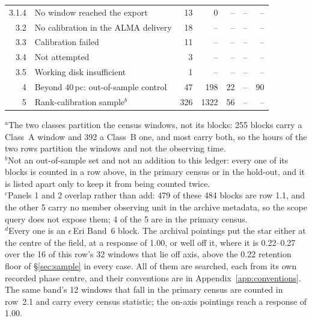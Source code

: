 \begin{tabular}{@{}r@{~}p{}rrrrr@{}}
3.1.4 & \hspace{1.6em}No window reached the export & 13 & 0 & -- & -- & -- \\
3.2 & \hspace{0.8em}No calibration in the ALMA delivery & 18 & -- & -- & -- & -- \\
3.3 & \hspace{0.8em}Calibration failed & 11 & -- & -- & -- & -- \\
3.4 & \hspace{0.8em}Not attempted & 3 & -- & -- & -- & -- \\
3.5 & \hspace{0.8em}Working disk insufficient & 1 & -- & -- & -- & -- \\
\hline
4 & Beyond 40\,pc: out-of-sample control & 47 & 198 & 22 & -- & 90 \\
5 & Rank-calibration sample$^{b}$ & 326 & 1322 & 56 & -- & -- \\
\hline
\end{tabular}

{\footnotesize\raggedright $^{a}$The two classes partition the census windows, not its blocks: 255 blocks carry a Class~A window and 392 a Class~B one, and most carry both, so the hours of the two rows partition the windows and not the observing time.\\ $^{b}$Not an out-of-sample set and not an addition to this ledger: every one of its blocks is counted in a row above, in the primary census or in the hold-out, and it is listed apart only to keep it from being counted twice.\\ $^{c}$Panels 1 and 2 overlap rather than add: 479 of these 484 blocks are row 1.1, and the other 5 carry no member observing unit in the archive metadata, so the scope query does not expose them; 4 of the 5 are in the primary census.\\ $^{d}$Every one is an $\epsilon$\,Eri Band~6 block. The archival pointings put the star either at the centre of the field, at a response of 1.00, or well off it, where it is 0.22--0.27 over the 16 of this row's 32 windows that lie off axis, above the 0.22 retention floor of \S\ref{sec:sample} in every case. All of them are searched, each from its own recorded phase centre, and their conventions are in Appendix~\ref{app:conventions}.\\ The same band's 12 windows that fall in the primary census are counted in row~2.1 and carry every census statistic; the on-axis pointings reach a response of 1.00.}
